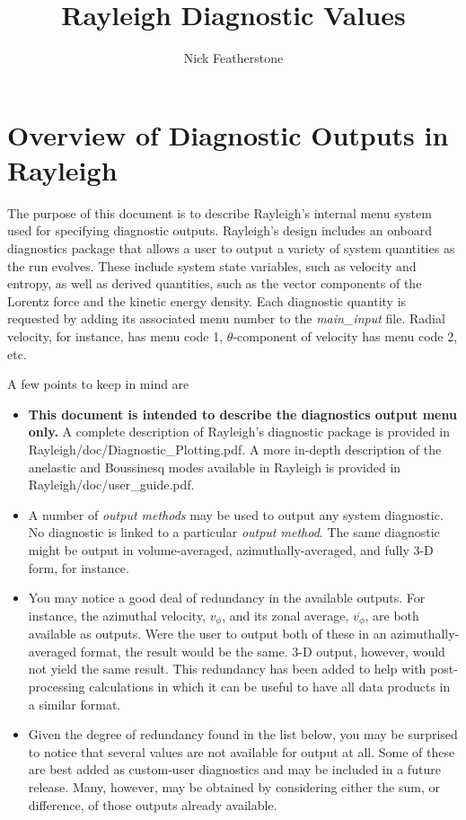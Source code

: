 \documentclass[10pt,letterpaper]{article}
\begin{document}
\title{Rayleigh Diagnostic Values}
\author{Nick Featherstone}

\maketitle

\tableofcontents

\clearpage

\section{Overview of Diagnostic Outputs in Rayleigh}
The purpose of this document is to describe Rayleigh's internal menu system used for specifying diagnostic outputs.  Rayleigh's design includes an onboard diagnostics package that allows a user to output a variety of system quantities as the run evolves.  These include system state variables, such as velocity and entropy, as well as derived quantities, such as the vector components of the Lorentz force and the kinetic energy density.  Each diagnostic quantity is requested by adding its associated menu number to the \textit{main\_input} file.  Radial velocity, for instance, has menu code 1, $\theta$-component of velocity has menu code 2, etc.    

A few points to keep in mind are
\begin{itemize}
	\item \textbf{This document is intended to describe the diagnostics output menu only.}   A complete description of Rayleigh's diagnostic package is provided in Rayleigh/doc/Diagnostic\_Plotting.pdf.   A more in-depth description of the anelastic and Boussinesq modes available in Rayleigh is provided in Rayleigh/doc/user\_guide.pdf.
	\item A number of \textit{output methods} may be used to output any system diagnostic.  No diagnostic is linked to a particular \textit{output method}.  The same diagnostic might be output in volume-averaged, azimuthally-averaged, and fully 3-D form, for instance.
	\item You may notice a good deal of redundancy in the available outputs.  For instance, the azimuthal velocity, $v_\phi$, and its zonal average, $\overline{v_\phi}$, are both available as outputs.  Were the user to output both of these in an azimuthally-averaged format, the result would be the same.  3-D output, however, would not yield the same result.  This redundancy has been added to help with post-processing calculations in which it can be useful to have all data products in a similar format.
	\item Given the degree of redundancy found in the list below, you may be surprised to notice that several values are not available for output at all.  Some of these are best added as custom-user diagnostics and may be included in a future release.  Many, however, may be obtained by considering either the sum, or difference, of those outputs already available.
\end{itemize}  
 
\end{document}

